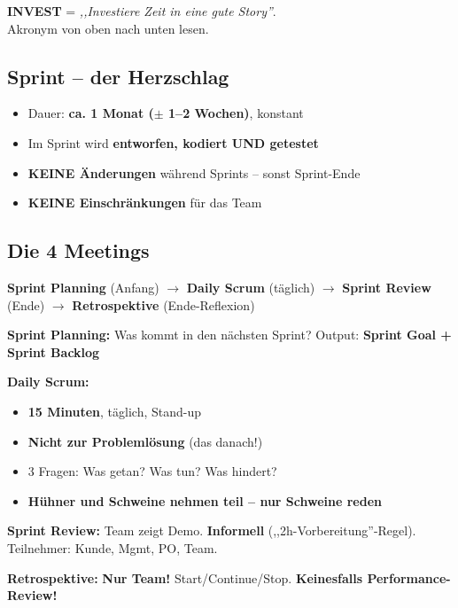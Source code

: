 \documentclass[11pt,a4paper]{article}
\begin{document}
\begin{merkhilfe}
\textbf{INVEST} = \emph{,,Investiere Zeit in eine gute Story''}.\\
Akronym von oben nach unten lesen.
\end{merkhilfe}

\subsection{Sprint -- der Herzschlag}

\begin{keyfacts}
\begin{itemize}
  \item Dauer: \textbf{ca. 1 Monat ($\pm$ 1--2 Wochen)}, konstant
  \item Im Sprint wird \textbf{entworfen, kodiert UND getestet}
  \item \textbf{KEINE Änderungen} während Sprints -- sonst Sprint-Ende
  \item \textbf{KEINE Einschränkungen} für das Team
\end{itemize}
\end{keyfacts}

\subsection{Die 4 Meetings}

\begin{tldr}
\textbf{Sprint Planning} (Anfang) $\rightarrow$ \textbf{Daily Scrum} (täglich) $\rightarrow$ \textbf{Sprint Review} (Ende) $\rightarrow$ \textbf{Retrospektive} (Ende-Reflexion)
\end{tldr}

\begin{keyfacts}
\textbf{Sprint Planning:} Was kommt in den nächsten Sprint? Output: \textbf{Sprint Goal + Sprint Backlog}

\textbf{Daily Scrum:}
\begin{itemize}
  \item \textbf{15 Minuten}, täglich, Stand-up
  \item \textbf{Nicht zur Problemlösung} (das danach!)
  \item 3 Fragen: Was getan? Was tun? Was hindert?
  \item \textbf{Hühner und Schweine nehmen teil -- nur Schweine reden}
\end{itemize}

\textbf{Sprint Review:} Team zeigt Demo. \textbf{Informell} (,,2h-Vorbereitung''-Regel). Teilnehmer: Kunde, Mgmt, PO, Team.

\textbf{Retrospektive:} \textbf{Nur Team!} Start/Continue/Stop. \textbf{Keinesfalls Performance-Review!}
\end{keyfacts}
\end{document}
